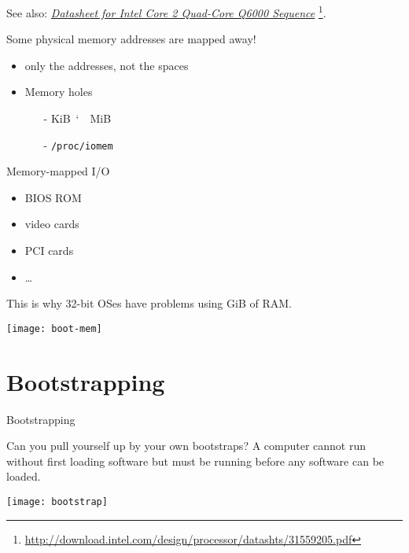 See also:
\href{http://download.intel.com/design/processor/datashts/31559205.pdf}{\emph{Datasheet
    for Intel Core 2 Quad-Core Q6000 Sequence}}
\footnote{\url{http://download.intel.com/design/processor/datashts/31559205.pdf}}.

\begin{frame}[plain]
  \begin{minipage}{.55\linewidth}
    \begin{block}{Some physical memory addresses are mapped away!}
      \begin{itemize}
      \item only the addresses, not the spaces
      \item Memory holes
        \begin{itemize}
        \item[-] \unit[640]{KiB}~\char`~~\unit[1]{MiB}
        \item[-] \texttt{/proc/iomem}
        \end{itemize}
      \end{itemize}
    \end{block}
    \begin{block}{Memory-mapped I/O}
      \begin{itemize}
      \item BIOS ROM
      \item video cards
      \item PCI cards
      \item \ldots
      \end{itemize}
      This is why 32-bit OSes have problems using \unit[4]{GiB} of RAM.
    \end{block}
  \end{minipage}\quad
  \begin{minipage}{.35\linewidth}
    \texttt{[image: boot-mem]}
  \end{minipage}
\end{frame}

\section{Bootstrapping}
\label{sec:bootstrapping}

\begin{frame}{Bootstrapping}
  \begin{minipage}{.85\linewidth}
    \begin{block}{Can you pull yourself up by your own bootstraps?}
      A computer cannot run without first loading software but must be
      running before any software can be loaded.
    \end{block}
  \end{minipage}\hfill
  \begin{minipage}{.1\linewidth}
    \texttt{[image: bootstrap]}
  \end{minipage}
    \begin{center}
  \end{center}
\end{frame}

